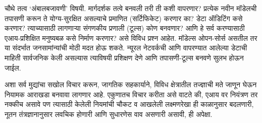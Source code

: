 चौथे तत्व ‘अंबालबजावणी’ विषयी. मार्गदर्शक तत्वे बनवली तरी ती कशी वापरणार? प्रत्येक नवीन मॉडेलची तपासणी करून ते योग्य-सुरक्षित असल्याचे प्रमाणित (सर्टिफिकेट) करणार का? डेटा ऑडिटिंग कसे करणार? त्याच्यासाठी लागणाऱ्या संगणकीय प्रणाली (टूल्स) कोण बनवणार? आणि हे सर्व करण्यासाठी एआय-प्रशिक्षित मनुष्यबळ कसे निर्माण करणार? असे विविध प्रश्न आहेत. मॉडेल्स ओपन-सोर्स असतील तर या संदर्भात जनसामांन्यांची मोठी मदत होऊ शकते. न्यूरल नेटवर्कची आणि वापरण्यात आलेल्या डेटाची माहिती सार्वजनिक केली असल्यास त्याविषयी प्रशिक्षण देणे आणि तपासणी-टूल्स बनवणे सुलभ होऊन जाईल.

अशा सर्व मुद्यांचा सखोल विचार करून, जागतिक सहकार्याने, विविध क्षेत्रातील तज्ज्ञाची मते जाणून घेऊन नियामक आराखडा बनवावा लागणार आहे. एकुणातच विचार करीता असे वाटते की, एआय वर नियंत्रण तर नक्कीच असावे पण त्यासाठी केलेली नियमांची चौकट व आखलेली लक्ष्मणरेखा ही काळानुसार बदलणारी, नूतन तंत्रज्ञानानुसार लवचिक होणारी आणि सुधारणेस वाव असणारी असावी, ही अपेक्षा.